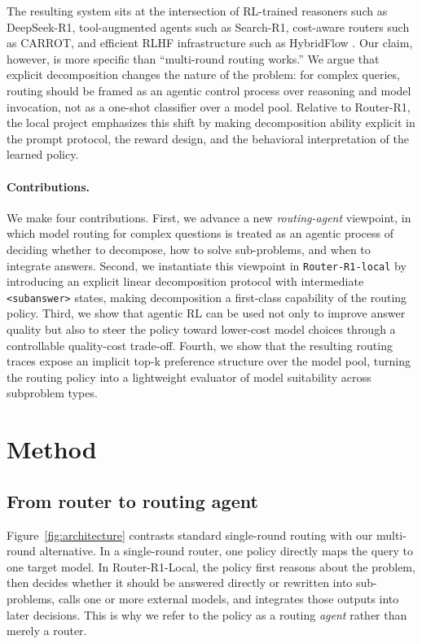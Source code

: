\documentclass{article}
\begin{document}
The resulting system sits at the intersection of RL-trained reasoners such as DeepSeek-R1, tool-augmented agents such as Search-R1, cost-aware routers such as CARROT, and efficient RLHF infrastructure such as HybridFlow \cite{deepseekr1,jin2025search,somerstep2025carrot,sheng2024hybridflow}. Our claim, however, is more specific than ``multi-round routing works.'' We argue that explicit decomposition changes the nature of the problem: for complex queries, routing should be framed as an agentic control process over reasoning and model invocation, not as a one-shot classifier over a model pool. Relative to Router-R1, the local project emphasizes this shift by making decomposition ability explicit in the prompt protocol, the reward design, and the behavioral interpretation of the learned policy.

\paragraph{Contributions.}
We make four contributions. First, we advance a new \emph{routing-agent} viewpoint, in which model routing for complex questions is treated as an agentic process of deciding whether to decompose, how to solve sub-problems, and when to integrate answers. Second, we instantiate this viewpoint in \texttt{Router-R1-local} by introducing an explicit linear decomposition protocol with intermediate \texttt{<subanswer>} states, making decomposition a first-class capability of the routing policy. Third, we show that agentic RL can be used not only to improve answer quality but also to steer the policy toward lower-cost model choices through a controllable quality-cost trade-off. Fourth, we show that the resulting routing traces expose an implicit top-k preference structure over the model pool, turning the routing policy into a lightweight evaluator of model suitability across subproblem types.

\section{Method}
\label{sec:method}

\subsection{From router to routing agent}

Figure~\ref{fig:architecture} contrasts standard single-round routing with our multi-round alternative. In a single-round router, one policy directly maps the query to one target model. In Router-R1-Local, the policy first reasons about the problem, then decides whether it should be answered directly or rewritten into sub-problems, calls one or more external models, and integrates those outputs into later decisions. This is why we refer to the policy as a routing \emph{agent} rather than merely a router.
\end{document}
